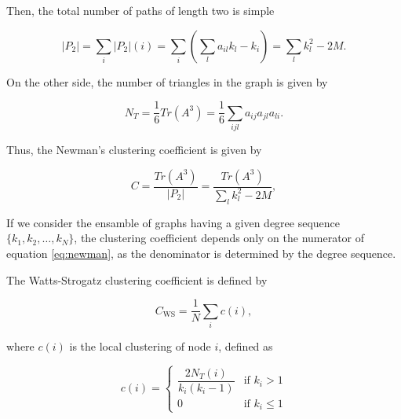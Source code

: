 \documentclass{article}
\begin{document}
Then, the total number of paths of length two is simple 

\begin{equation} \label{eq:P2}
    |P_2| = \sum_i |P_2|(i) = \sum_i \left( \sum_{l} a_{il} k_l - k_i \right) = \sum_l k_l^2 - 2M.
\end{equation}

On the other side, the number of triangles in the graph is given by

\begin{equation} \label{eq:T}
    N_T = \dfrac{1}{6} Tr(A^3) = \dfrac{1}{6} \sum_{ijl} a_{ij} a_{jl} a_{li}.
\end{equation}

Thus, the Newman's clustering coefficient is given by

\begin{equation} \label{eq:newman}
    C = \dfrac{Tr(A^3)}{|P_2|} = \dfrac{Tr(A^3)}{\sum_l k_l^2 - 2M},
\end{equation}

If we consider the ensamble of graphs having a given degree sequence $\lbrace k_1, k_2, \dots, k_N\rbrace$, the clustering coefficient depends only on the numerator of equation \ref{eq:newman}, as the denominator is determined by the degree sequence.

The Watts-Strogatz clustering coefficient is defined by

\begin{equation} \label{eq:ws}
    C_{\mathrm{WS}} = \dfrac{1}{N} \sum_{i} c(i),
\end{equation}

where $c(i)$ is the local clustering of node $i$, defined as

\begin{equation}
    c(i) = 
    \left\{
    	\begin{array}{ll}
    		\dfrac{2 N_{T}(i)}{k_i (k_i-1)}  & \mbox{if } k_i > 1 \\
    		0 & \mbox{if } k_i \leq 1
    	\end{array}
    \right.
\end{equation}

\end{document}

